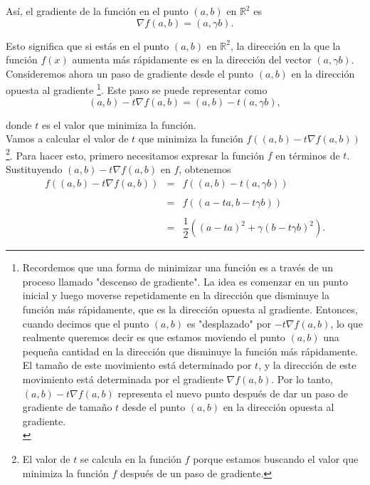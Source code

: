 \begin{enumerate}
\begin{enumerate}[\bfseries (a)]
	    Así, el gradiente de la función en el punto $(a,b)$ en $\mathbb{R}^2$ es 
	    $$\nabla f(a,b) = (a, \gamma b).$$

	    Esto significa que si estás en el punto $(a,b)$ en $\mathbb{R}^2$, la dirección en la que la función $f(x)$ aumenta más rápidamente es en la dirección del vector $(a, \gamma b)$.\\

	    Consideremos ahora un paso de gradiente desde el punto $(a,b)$ en la dirección opuesta al gradiente 
	    \footnote{
		Recordemos que una forma de minimizar una función es a través de un proceso llamado "descenso de gradiente". La idea es comenzar en un punto inicial y luego moverse repetidamente en la dirección que disminuye la función más rápidamente, que es la dirección opuesta al gradiente. Entonces, cuando decimos que el punto $(a,b)$ es "desplazado" por $-t\nabla f(a,b)$, lo que realmente queremos decir es que estamos moviendo el punto $(a,b)$ una pequeña cantidad en la dirección que disminuye la función más rápidamente. El tamaño de este movimiento está determinado por $t$, y la dirección de este movimiento está determinada por el gradiente $\nabla f(a,b)$.
		Por lo tanto, $(a,b)-t\nabla f(a,b)$ representa el nuevo punto después de dar un paso de gradiente de tamaño $t$ desde el punto $(a,b)$ en la dirección opuesta al gradiente.\\}. 
	    Este paso se puede representar como 
	    $$(a,b)-t\nabla f(a,b)=(a,b)-t(a,\gamma b),$$ 

	    donde $t$ es el valor que minimiza la función.\\

	    Vamos a calcular el valor de $t$ que minimiza la función $f\left((a,b)-t\nabla f(a,b)\right)$ 
	    \footnote{ El valor de $t$ se calcula en la función $f$ porque estamos buscando el valor que minimiza la función $f$ después de un paso de gradiente.}. 
	    Para hacer esto, primero necesitamos expresar la función $f$ en términos de $t$. Sustituyendo $(a,b)-t\nabla f(a,b)$ en $f$, obtenemos
	    $$
	    \begin{array}{rcl}
	    f\left((a,b)-t\nabla f(a,b)\right) &=& f\left((a,b)-t(a,\gamma b)\right)\\\\
					       &=& f\left((a-ta, b-t\gamma b)\right)\\\\
					       &=& \dfrac{1}{2}\left((a-ta)^2 + \gamma (b-t\gamma b)^2\right).
	    \end{array}
	    $$


\end{enumerate}
\end{enumerate}

